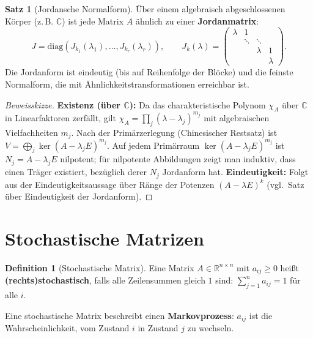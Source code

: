 ﻿\documentclass[a4paper,12pt]{report}
\theoremstyle{definition}
\newtheorem{definition}{Definition}
\newtheorem{satz}{Satz}
\begin{document}
\begin{satz}[Jordansche Normalform]
    Über einem algebraisch abgeschlossenen Körper (z.\,B. $\mathbb{C}$) ist
    jede Matrix $A$ ähnlich zu einer \textbf{Jordanmatrix}:
    \[
        J = \mathrm{diag}(J_{k_1}(\lambda_1), \dots, J_{k_r}(\lambda_r)), \qquad
        J_k(\lambda) = \begin{pmatrix} \lambda & 1 & & \\ & \ddots & \ddots & \\
        & & \lambda & 1 \\ & & & \lambda \end{pmatrix}.
    \]
    Die Jordanform ist eindeutig (bis auf Reihenfolge der Blöcke) und die
    feinste Normalform, die mit Ähnlichkeitstransformationen erreichbar ist.
\end{satz}
\begin{proof}[Beweisskizze]
    \textbf{Existenz (über $\mathbb{C}$):} Da das charakteristische Polynom
    $\chi_A$ über $\mathbb{C}$ in Linearfaktoren zerfällt, gilt
    $\chi_A = \prod_j (\lambda - \lambda_j)^{m_j}$ mit algebraischen
    Vielfachheiten $m_j$. Nach der Primärzerlegung (Chinesischer Restsatz)
    ist $V = \bigoplus_j \ker(A - \lambda_j E)^{m_j}$.
    Auf jedem Primärraum $\ker(A - \lambda_j E)^{m_j}$ ist $N_j = A - \lambda_j E$
    nilpotent; für nilpotente Abbildungen zeigt man induktiv, dass
    einen Träger existiert, bezüglich derer $N_j$ Jordanform hat.
    \textbf{Eindeutigkeit:} Folgt aus der Eindeutigkeitsaussage über Ränge
    der Potenzen $(A - \lambda E)^k$ (vgl.\ Satz über Eindeutigkeit der Jordanform).
\end{proof}


\section{Stochastische Matrizen}

\begin{definition}[Stochastische Matrix]
    Eine Matrix $A \in \mathbb{R}^{n \times n}$ mit $a_{ij} \ge 0$ heißt
    \textbf{(rechts)stochastisch}, falls alle Zeilensummen gleich $1$ sind:
    $\sum_{j=1}^n a_{ij} = 1$ für alle $i$.

    Eine stochastische Matrix beschreibt einen \textbf{Markovprozess}:
    $a_{ij}$ ist die Wahrscheinlichkeit, vom Zustand $i$ in Zustand $j$
    zu wechseln.
\end{definition}
\end{document}
